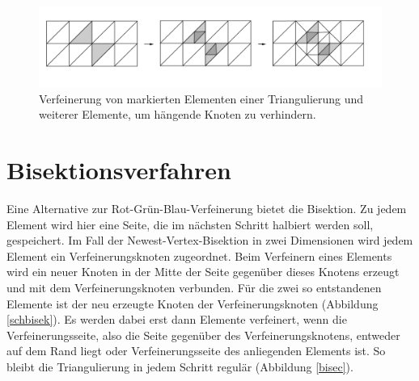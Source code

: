 \begin{figure}[!htbp]
	\begin{center}
		\includegraphics[width=16cm]{pics/refin.png}
	\end{center}
	\caption{Verfeinerung von markierten Elementen einer Triangulierung und weiterer Elemente, um hängende Knoten zu verhindern.}
\end{figure}

\section{Bisektionsverfahren}
Eine Alternative zur Rot-Grün-Blau-Verfeinerung bietet die Bisektion. Zu jedem Element wird hier eine Seite, die im nächsten Schritt halbiert werden soll, gespeichert. Im Fall der Newest-Vertex-Bisektion in zwei Dimensionen wird jedem Element ein Verfeinerungsknoten zugeordnet. Beim Verfeinern eines Elements wird ein neuer Knoten in der Mitte der Seite gegenüber dieses Knotens erzeugt und mit dem Verfeinerungsknoten verbunden. Für die zwei so entstandenen Elemente ist der neu erzeugte Knoten der Verfeinerungsknoten (Abbildung \ref{schbisek}). Es werden dabei erst dann Elemente verfeinert, wenn die Verfeinerungsseite, also die Seite gegenüber des Verfeinerungsknotens, entweder auf dem Rand liegt oder Verfeinerungsseite des anliegenden Elements ist. So bleibt die Triangulierung in jedem Schritt regulär (Abbildung \ref{bisec}).

